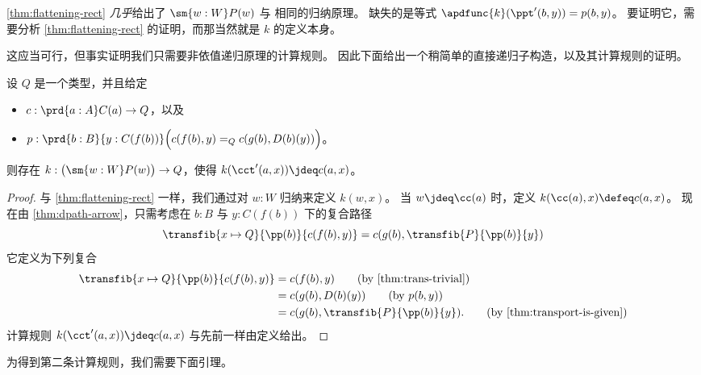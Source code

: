 \cref{thm:flattening-rect} \emph{几乎}给出了 $\sm{w:W}P(w)$ 与 \Wtil 相同的归纳原理。
缺失的是等式 $\apdfunc{k}(\ppt'(b,y)) = p(b,y)$。
要证明它，需要分析 \cref{thm:flattening-rect} 的证明，而那当然就是 $k$ 的定义本身。

这应当可行，但事实证明我们只需要非依值递归原理的计算规则。
因此下面给出一个稍简单的直接递归子构造，以及其计算规则的证明。

\begin{lem}\label{thm:flattening-rectnd}
  设 $Q$ 是一个类型，并且给定
  \begin{itemize}
  \item $c : \prd{a:A} C(a) \to Q$，以及
  \item $p : \prd{b:B}{y:C(f(b))} \Big(c(f(b),y) =_Q c(g(b),D(b)(y))\Big)$。
  \end{itemize}
  则存在 $k:\big(\sm{w:W} P(w)\big) \to Q$，使得 $k(\cct'(a,x)) \jdeq c(a,x)$。
\end{lem}
\begin{proof}
  与 \cref{thm:flattening-rect} 一样，我们通过对 $w:W$ 归纳来定义 $k(w,x)$。
  当 $w\jdeq \cc(a)$ 时，定义 $k(\cc(a),x)\defeq c(a,x)$。
  现在由 \cref{thm:dpath-arrow}，只需考虑在 $b:B$ 与 $y:C(f(b))$ 下的复合路径
  \begin{equation}\label{eq:flattening-rectnd}
    \transfib{x\mapsto Q}{\pp(b)}{c(f(b),y)}
    = c(g(b),\transfib{P}{\pp(b)}{y})
  \end{equation}
  它定义为下列复合
  \begin{align}
    \transfib{x\mapsto Q}{\pp(b)}{c(f(b),y)}
    &= c(f(b),y) \tag{by \cref{thm:trans-trivial}}\\
    &= c(g(b),D(b)(y)) \tag{by $p(b,y)$}\\
    &= c(g(b),\transfib{P}{\pp(b)}{y}). \tag{by \cref{thm:transport-is-given}}
  \end{align}
  计算规则 $k(\cct'(a,x)) \jdeq c(a,x)$ 与先前一样由定义给出。
\end{proof}

为得到第二条计算规则，我们需要下面引理。

